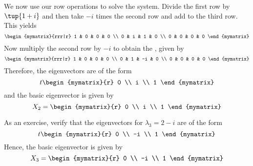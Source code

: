 \begin{solution}
We now use our row operations to solve the system.
Divide the first row by $\tup{1+i} $ and then take 
$-i$ times the second row and add to the third row. This yields
\begin{equation*}
\begin{mymatrix}{rrr|r}
1 & 0 & 0 & 0 \\
0 & i & 1 & 0 \\
0 & 0 & 0 & 0
\end{mymatrix}
\end{equation*}
Now multiply the second row by $-i$ to obtain the {\rref}, given by 
\begin{equation*}
\begin{mymatrix}{rrr|r}
1 & 0 &  0 & 0 \\
0 & 1 & -i & 0 \\
0 & 0 &  0 & 0
\end{mymatrix}
\end{equation*}
Therefore, the eigenvectors are of the form
\begin{equation*}
t\begin{mymatrix}{r}
0 \\
i \\
1
\end{mymatrix} 
\end{equation*}
and the basic eigenvector is given by
\begin{equation*}
X_2 =
\begin{mymatrix}{r}
0 \\
i \\
1
\end{mymatrix}
\end{equation*}

As an exercise, verify that the eigenvectors for $\lambda_3 =2-i$ are of the form 
\begin{equation*}
t\begin{mymatrix}{r}
 0 \\
-i \\
 1
\end{mymatrix} 
\end{equation*}
Hence, the basic eigenvector is given by 
\begin{equation*}
X_3 = \begin{mymatrix}{r}
 0 \\
-i \\
 1
\end{mymatrix} 
\end{equation*}


\end{solution}
